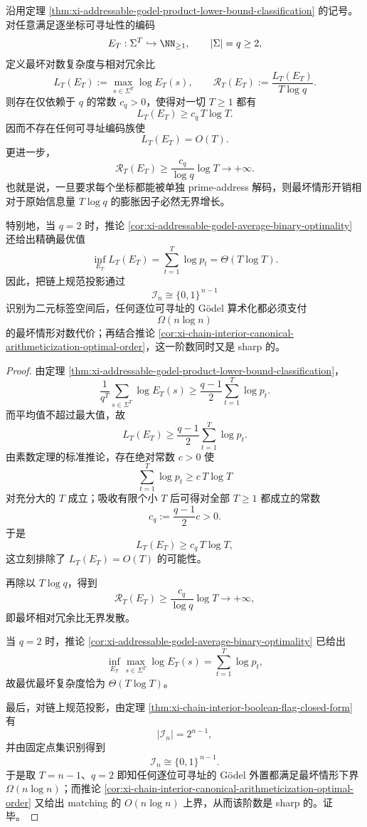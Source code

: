 \begin{theorem}\label{thm:xi-addressable-godel-worstcase-redundancy-diverges}
沿用定理 \ref{thm:xi-addressable-godel-product-lower-bound-classification} 的记号。对任意满足逐坐标可寻址性的编码
\[
E_T:\Sigma^T\hookrightarrow \NN_{\ge 1},
\qquad
|\Sigma|=q\ge 2,
\]
定义最坏对数复杂度与相对冗余比
\[
L_T(E_T):=\max_{s\in\Sigma^T}\log E_T(s),
\qquad
\mathscr R_T(E_T):=\frac{L_T(E_T)}{T\log q}.
\]
则存在仅依赖于 \(q\) 的常数 \(c_q>0\)，使得对一切 \(T\ge 1\) 都有
\[
\boxed{\;
L_T(E_T)\ge c_q\,T\log T.\;}
\]
因而不存在任何可寻址编码族使
\[
L_T(E_T)=O(T).
\]
更进一步，
\[
\boxed{\;
\mathscr R_T(E_T)\ge \frac{c_q}{\log q}\log T\longrightarrow +\infty.\;}
\]
也就是说，一旦要求每个坐标都能被单独 prime-address 解码，则最坏情形开销相对于原始信息量 \(T\log q\) 的膨胀因子必然无界增长。

特别地，当 \(q=2\) 时，推论 \ref{cor:xi-addressable-godel-average-binary-optimality} 还给出精确最优值
\[
\inf_{E_T}L_T(E_T)=\sum_{t=1}^{T}\log p_t=\Theta(T\log T).
\]
因此，把链上规范投影通过
\[
\mathcal I_n\cong \{0,1\}^{\,n-1}
\]
识别为二元标签空间后，任何逐位可寻址的 Gödel 算术化都必须支付
\[
\Omega(n\log n)
\]
的最坏情形对数代价；再结合推论 \ref{cor:xi-chain-interior-canonical-arithmeticization-optimal-order}，这一阶数同时又是 sharp 的。
\end{theorem}
\begin{proof}
由定理 \ref{thm:xi-addressable-godel-product-lower-bound-classification}，
\[
\frac{1}{q^T}\sum_{s\in\Sigma^T}\log E_T(s)
\ge
\frac{q-1}{2}\sum_{t=1}^{T}\log p_t.
\]
而平均值不超过最大值，故
\[
L_T(E_T)\ge \frac{q-1}{2}\sum_{t=1}^{T}\log p_t.
\]
由素数定理的标准推论，存在绝对常数 \(c>0\) 使
\[
\sum_{t=1}^{T}\log p_t\ge c\,T\log T
\]
对充分大的 \(T\) 成立；吸收有限个小 \(T\) 后可得对全部 \(T\ge1\) 都成立的常数
\[
c_q:=\frac{q-1}{2}c>0.
\]
于是
\[
L_T(E_T)\ge c_q\,T\log T,
\]
这立刻排除了 \(L_T(E_T)=O(T)\) 的可能性。

再除以 \(T\log q\)，得到
\[
\mathscr R_T(E_T)\ge \frac{c_q}{\log q}\log T\to+\infty,
\]
即最坏相对冗余比无界发散。

当 \(q=2\) 时，推论 \ref{cor:xi-addressable-godel-average-binary-optimality} 已给出
\[
\inf_{E_T}\max_{s\in\Sigma^T}\log E_T(s)=\sum_{t=1}^{T}\log p_t,
\]
故最优最坏复杂度恰为 \(\Theta(T\log T)\)。

最后，对链上规范投影，由定理 \ref{thm:xi-chain-interior-boolean-flag-closed-form} 有
\[
|\mathcal I_n|=2^{n-1},
\]
并由固定点集识别得到
\[
\mathcal I_n\cong \{0,1\}^{\,n-1}.
\]
于是取 \(T=n-1\)、\(q=2\) 即知任何逐位可寻址的 Gödel 外置都满足最坏情形下界 \(\Omega(n\log n)\)；而推论 \ref{cor:xi-chain-interior-canonical-arithmeticization-optimal-order} 又给出 matching 的 \(O(n\log n)\) 上界，从而该阶数是 sharp 的。证毕。
\end{proof}
